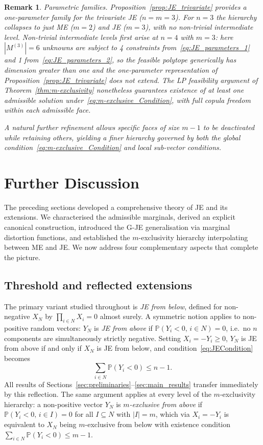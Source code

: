 \documentclass[letterpaper,12pt]{article}
\def \P {\mathbb{P}}
\numberwithin{equation}{section}
\newtheorem{remark}[theorem]{Remark}
\newcommand{\N}{{N}}
\newcommand{\M}{{M}}
\begin{document}
{\begin{remark}
\textit{Parametric families.}
Proposition~\ref{prop:JE_trivariate} provides a one-parameter family for
the trivariate JE ($n=m=3$). For $n=3$ the hierarchy collapses to just ME
($m=2$) and JE ($m=3$), with no non-trivial intermediate level. Non-trivial
intermediate levels first arise at $n=4$ with $m=3$: here $|\M^{(3)}|=6$
unknowns are subject to 4 constraints from~\eqref{eq:JE_parameters_1} and 1
from~\eqref{eq:JE_parameters_2}, so the feasible polytope generically has
dimension greater than one and the one-parameter representation of
Proposition~\ref{prop:JE_trivariate} does not extend. The LP feasibility
argument of Theorem~\ref{thm:m-exclusivity} nonetheless guarantees existence
of at least one admissible solution under~\eqref{eq:m-exclusive_Condition},
with full copula freedom within each admissible face.

A natural further refinement allows specific faces of size $m-1$ to be
deactivated while retaining others, yielding a finer hierarchy governed by
both the global condition~\eqref{eq:m-exclusive_Condition} and local
sub-vector conditions.
\end{remark}
\section{Further Discussion}
\label{sec:further_discussion}

The preceding sections developed a comprehensive theory of JE and its
extensions. We characterised the admissible marginals, derived an explicit
canonical construction, introduced the G-JE generalisation via marginal
distortion functions, and established the $m$-exclusivity hierarchy
interpolating between ME and JE. We now address four complementary aspects
that complete the picture.

\subsection{Threshold and reflected extensions}
\label{subsec:threshold}

The primary variant studied throughout is \emph{JE from below}, defined for
non-negative $X_\N$ by $\prod_{i\in\N}X_i=0$ almost surely. A symmetric
notion applies to non-positive random vectors: $Y_\N$ is \emph{JE from above}
if $\P(Y_i<0,\,i\in\N)=0$, i.e.\ no $n$ components are simultaneously
strictly negative. Setting $X_i=-Y_i\ge0$, $Y_\N$ is JE from above if and
only if $X_\N$ is JE from below, and condition~\eqref{eq:JECondition} becomes
\[
\sum_{i\in\N}\P(Y_i<0)\le n-1.
\]
All results of Sections~\ref{sec:preliminaries}--\ref{sec:main_results}
transfer immediately by this reflection. The same argument applies at every
level of the $m$-exclusivity hierarchy: a non-positive vector $Y_\N$ is
\emph{$m$-exclusive from above} if $\P(Y_i<0,\,i\in I)=0$ for all
$I\subseteq\N$ with $|I|=m$, which via $X_i=-Y_i$ is equivalent to $X_\N$
being $m$-exclusive from below with existence condition
$\sum_{i\in\N}\P(Y_i<0)\le m-1$.

}
\end{document}
